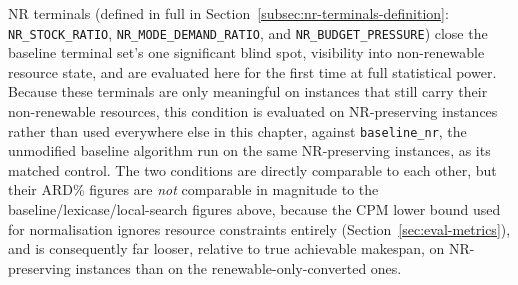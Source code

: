 NR terminals (defined in full in Section~\ref{subsec:nr-terminals-definition}:
\texttt{NR\_STOCK\_RATIO}, \texttt{NR\_MODE\_DEMAND\_RATIO}, and
\texttt{NR\_BUDGET\_PRESSURE}) close the baseline terminal set's one
significant blind spot, visibility into non-renewable resource state, and
are evaluated here for the first time at full statistical power. Because
these terminals are only meaningful on instances that still carry their
non-renewable resources, this condition is evaluated on NR-preserving
instances rather than  used
everywhere else in this chapter, against \texttt{baseline\_nr}, the
unmodified baseline algorithm run on the same NR-preserving instances, as
its matched control. The two conditions are directly comparable to each
other, but their ARD\% figures are \emph{not} comparable in magnitude to
the baseline/lexicase/local-search figures above, because the CPM lower
bound used for normalisation ignores resource constraints entirely
(Section~\ref{sec:eval-metrics}), and is consequently far looser, relative
to true achievable makespan, on NR-preserving instances than on the
renewable-only-converted ones. 

